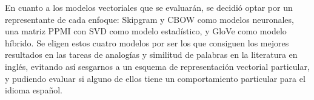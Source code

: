 En cuanto a los modelos vectoriales que se evaluarán, se decidió optar por un representante de cada
enfoque: Skipgram y CBOW como modelos neuronales, una matriz PPMI con SVD como modelo estadístico, y
GloVe como modelo híbrido. Se eligen estos cuatro modelos por ser los que consiguen los mejores
resultados en las tareas de analogías y similitud de palabras en la literatura en inglés, evitando
así sesgarnos a un esquema de representación vectorial particular, y pudiendo evaluar si alguno de
ellos tiene un comportamiento particular para el idioma español.
